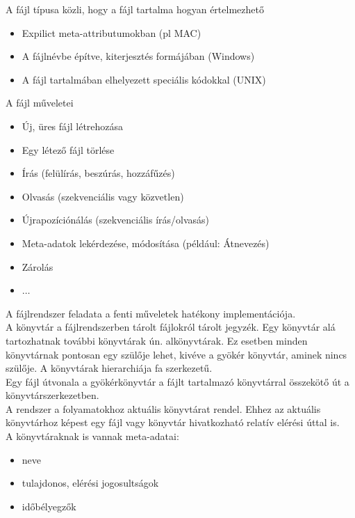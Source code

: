 \documentclass[tikz,12pt,margin=0px]{article}
\begin{document}
    \noindent A fájl típusa közli, hogy a fájl tartalma hogyan értelmezhető
    \begin{itemize}
      \item Expilict meta-attributumokban (pl MAC)
      \item A fájlnévbe építve, kiterjesztés formájában (Windows)
      \item A fájl tartalmában elhelyezett speciális kódokkal (UNIX)
    \end{itemize}

    \noindent A fájl műveletei
    \begin{itemize}[topsep=8pt,itemsep=4pt,partopsep=4pt, parsep=4pt]
        \item Új, üres fájl létrehozása
        \item Egy létező fájl törlése
        \item Írás (felülírás, beszúrás, hozzáfűzés)
        \item Olvasás (szekvenciális vagy közvetlen)
        \item Újrapozíciónálás (szekvenciális írás/olvasás)
        \item Meta-adatok lekérdezése, módosítása (például: Átnevezés)
        \item Zárolás
        \item $\ldots$
    \end{itemize}

    \noindent A fájlrendszer feladata a fenti műveletek hatékony implementációja.\\

    \noindent A könyvtár a fájlrendszerben tárolt fájlokról tárolt jegyzék. Egy könyvtár alá tartozhatnak további könyvtárak ún. alkönyvtárak. Ez esetben minden könyvtárnak pontosan egy szülője lehet, kivéve a gyökér könyvtár, aminek nincs szülője. A könyvtárak hierarchiája fa szerkezetű.\\

    \noindent Egy fájl útvonala a gyökérkönyvtár a fájlt tartalmazó könyvtárral összekötő út a könyvtárszerkezetben.\\

    \noindent A rendszer a folyamatokhoz aktuális könyvtárat rendel. Ehhez az aktuális könyvtárhoz képest egy fájl vagy könyvtár hivatkozható relatív elérési úttal is.\\

    \noindent A könyvtáraknak is vannak meta-adatai:
    \begin{itemize}[topsep=8pt,itemsep=4pt,partopsep=4pt, parsep=4pt]
        \item neve
        \item tulajdonos, elérési jogosultságok
        \item időbélyegzők
    \end{itemize}
\end{document}
